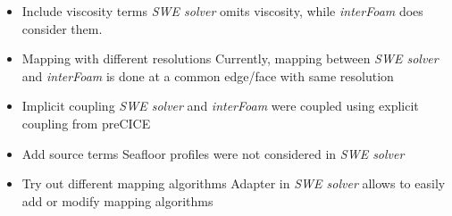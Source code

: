 \begin{frame}

\begin{itemize}
\item[]
\begin{exampleblock}{Include viscosity terms }
\textit{SWE solver} omits viscosity, while \textit{interFoam} does consider them.  
\end{exampleblock}
\item[]

\begin{exampleblock}{Mapping with different resolutions}
Currently, mapping between \textit{SWE solver} and \textit{interFoam} is done at a common edge/face with same resolution
\end{exampleblock}
\item[]

\begin{exampleblock}{Implicit coupling}
\textit{SWE solver} and \textit{interFoam} were coupled using explicit coupling from preCICE
\end{exampleblock}
\item[]

\begin{exampleblock}{Add source terms}
Seafloor profiles were not considered in \textit{SWE solver}
\end{exampleblock}
\item[]

\begin{exampleblock}{Try out different mapping algorithms}
Adapter in \textit{SWE solver}  allows to easily add or modify mapping algorithms 
\end{exampleblock}


\end{itemize}


\end{frame}



